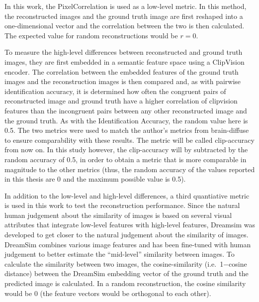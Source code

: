 In this work, the PixelCorrelation is used as a low-level metric\cite{shenDeepImageReconstruction2019,ozcelikNaturalSceneReconstruction2023}. In this method, the reconstructed images and the ground truth image are first reshaped into a one-dimensional vector and the correlation between the two is then calculated. The expected value for random reconstructions would be $r=0$.

To measure the high-level differences between reconstructed and ground truth images, they are first embedded in a semantic feature space using a ClipVision encoder\cite{radfordLearningTransferableVisual2021}. The correlation between the embedded features of the ground truth images and the reconstruction images is then compared and, as with pairwise identification accuracy, it is determined how often the congruent pairs of reconstructed image and ground truth have a higher correlation of clipvision features than the incongruent pairs between any other reconstructed image and the ground truth. As with the Identification Accuracy, the random value here is 0.5. The two metrics were used to match the author's metrics from brain-diffuse\cite{ozcelikNaturalSceneReconstruction2023} to ensure comparability with these results. The metric will be called clip-accuracy from now on. In this study however, the clip-accuracy will by subtracted by the random accuracy of 0.5, in order to obtain a metric that is more comparable in magnitude to the other metrics (thus, the random accuracy of the values reported in this thesis are 0 and the maximum possible value is 0.5).

In addition to the low-level and high-level differences, a third quantiative metric is used in this work to test the reconstruction performance. Since the natural human judgement about the similarity of images is based on several visual attributes that integrate low-level features with high-level features\cite{sundaramWhenDoesPerceptual2024}, Dreamsim\cite{fuDreamSimLearningNew2023} was developed to get closer to the natural judgement about the similarity of images. DreamSim combines various image features and has been fine-tuned with human judgement to better estimate the ``mid-level'' similarity between images. To calculate the similarity between two images, the cosine-similarity (i.e.\ 1\@ $-$\@ cosine distance) between the DreamSim embedding vector of the ground truth and the predicted image is calculated. In a random reconstruction, the cosine similarity would be 0 (the feature vectors would be orthogonal to each other).


